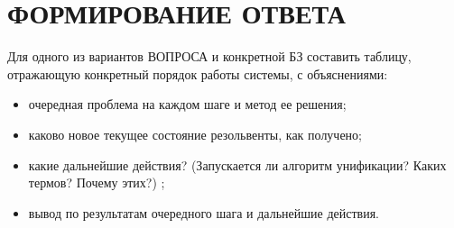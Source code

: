 \section{ФОРМИРОВАНИЕ ОТВЕТА}

Для одного из вариантов ВОПРОСА и конкретной БЗ составить таблицу, отражающую конкретный порядок работы системы, с объяснениями:

\begin{itemize}
    \item очередная проблема на каждом шаге и метод ее решения;
    \item каково новое текущее состояние резольвенты, как получено;
    \item какие дальнейшие действия? (Запускается ли алгоритм унификации? Каких термов? Почему этих?) ;
    \item вывод по результатам очередного шага и дальнейшие действия.
\end{itemize}

